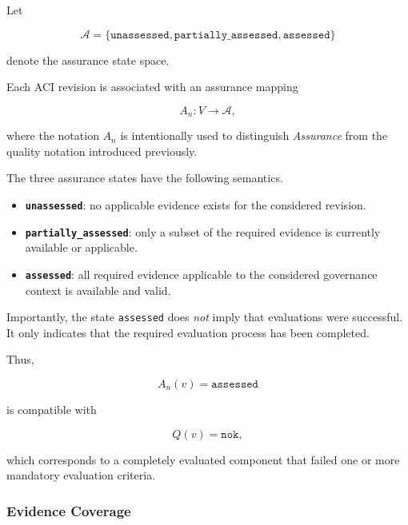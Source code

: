\documentclass[10pt]{article}
\begin{document}
Let

\begin{equation}
\mathcal{A}
=
\{
\texttt{unassessed},
\texttt{partially\_assessed},
\texttt{assessed}
\}
\label{eq:assurance_states}
\end{equation}

denote the assurance state space.

Each ACI revision is associated with an assurance mapping

\begin{equation}
A_n :
V
\rightarrow
\mathcal{A},
\label{eq:assurance_mapping}
\end{equation}

where the notation \(A_n\) is intentionally used to distinguish
\emph{Assurance} from the quality notation introduced previously.

The three assurance states have the following semantics.

\begin{itemize}
    \item \textbf{\texttt{unassessed}}: no applicable evidence exists for the
    considered revision.

    \item \textbf{\texttt{partially\_assessed}}: only a subset of the required
    evidence is currently available or applicable.

    \item \textbf{\texttt{assessed}}: all required evidence applicable to the
    considered governance context is available and valid.
\end{itemize}

Importantly, the state
\texttt{assessed}
does \emph{not} imply that evaluations were successful.
It only indicates that the required evaluation process has been completed.

Thus,

\[
A_n(v)=\texttt{assessed}
\]

is compatible with

\[
Q(v)=\texttt{nok},
\]

which corresponds to a completely evaluated component that failed one or more
mandatory evaluation criteria.

\subsubsection{Evidence Coverage}
\end{document}
